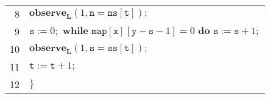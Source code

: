\documentclass{llncs}
\begin{document}
\begin{center}
\begin{tabular}{rl}
8	& \hspace{20pt}	$\textbf{observe}_{\textbf{L}}(1, \texttt{n} = \texttt{ns}[\texttt{t}]);$ \\
9	& \hspace{20pt}	$\texttt{s} := 0; \textbf{ while }\texttt{map}[\texttt{x}][\texttt{y} - \texttt{s} - 1] = 0\textbf{ do }\texttt{s} := \texttt{s} + 1;$ \\
10	& \hspace{20pt}	$\textbf{observe}_{\textbf{L}}(1, \texttt{s} = \texttt{ss}[\texttt{t}]);$ \\
11	& \hspace{20pt}	$\texttt{t} := \texttt{t} + 1;$\\
12	& $\}$ \\
\hline
\end{tabular} 
\end{center} 
\end{document}
